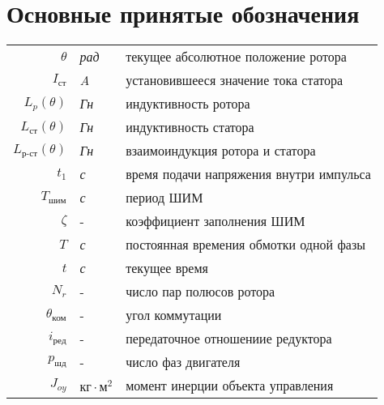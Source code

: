 \newpage
\section{Основные принятые обозначения}

\begin{table}[ht!]
    \begin{tabular}{rll}
    $\theta$            & \textit{рад} & текущее абсолютное положение ротора \\

    $I_{\textit{ст}}$   & \textit{A} & установившееся значение тока статора \\

    $L_{p}(\theta)$     & \textit{Гн} & индуктивность ротора \\

    $L_{\textit{ст}}(\theta)$     & \textit{Гн} & индуктивность статора \\

    $L_{\textit{р-ст}}(\theta)$   & \textit{Гн} & взаимоиндукция ротора и статора \\

    $t_{1}$             & \textit{с} & время подачи напряжения внутри импульса \\

    $T_\textit{шим}$    & \textit{с} & период ШИМ \\

    $\zeta$             & - & коэффициент заполнения ШИМ \\

    $T$                 & \textit{с} & постоянная времения обмотки одной фазы \\

    $t$                 & \textit{с} & текущее время \\

    $N_{r}$             & - & число пар полюсов ротора \\

    $\theta_{\textit{ком}}$& - & угол коммутации \\

    $i_\textit{ред}$    & - & передаточное отношениие редуктора \\

    $p_{\textit{шд}}$   & - & число фаз двигателя \\

    $J_{oy}$            & $\textit{кг} \cdot \textit{м}^{2}$ & момент инерции объекта управления \\


\end{tabular}
\end{table}
